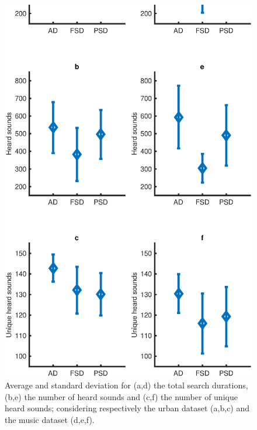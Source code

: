 \documentclass{aes2e}
\begin{document}
\begin{figure}[t]
\begin{center}
\includegraphics[width=\columnwidth]{gfx/urbanMusic1.eps} 
\end{center}
\caption{\label{urbanMusic} Average and standard deviation for (a,d) the total search durations, (b,e) the number of heard sounds and (c,f) the number of unique heard sounds; considering respectively the urban dataset (a,b,c) and the music dataset (d,e,f).}
\end{figure}  
\end{document}
